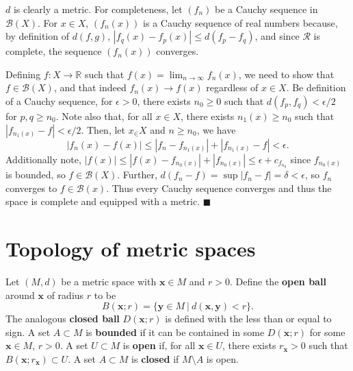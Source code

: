\documentclass[letter-paper]{tufte-book}
\newenvironment{proof}[1][Proof]{\begin{trivlist}
\item[\hskip \labelsep {\bfseries #1}]}{\end{trivlist}}
\newcommand{\xb}{\boldsymbol{x}}
\newcommand{\yb}{\boldsymbol{y}}
\newcommand{\qed}{\hfill$\blacksquare$}
\begin{document}
\begin{proof}
  $d$ is clearly a metric. For completeness, let $(f_n)$ be a Cauchy sequence in
  $\mathcal{B}(X)$. For $x\in X$, $(f_n(x))$ is a Cauchy sequence of real
  numbers because, by definition of $d(f,g)$, $|f_q(x) - f_p(x)| \leq d(f_p -
  f_q)$, and since $\mathcal{R}$ is complete, the sequence $(f_n(x))$ converges.
  
  Defining $f: X\to\mathbb{R}$ such that $f(x) = \lim_{n\to\infty} f_n(x)$, we
  need to show that $f\in\mathcal{B}(X)$, and that indeed $f_n(x) \to f(x)$
  regardless of $x\in X$. Be definition of a Cauchy sequence, for $\epsilon >0$,
  there exists $n_0 \geq 0$ such that $d(f_p, f_q) < \epsilon / 2$ for $p, q
  \geq n_0$. Note also that, for all $x\in X$, there exists $n_1(x) \geq n_0$
  such that $|f_{n_1(x)} - f| < \epsilon / 2$. Then, let $x_\in X$ and $n \geq
  n_0$, we have
  \begin{equation*}
    |f_n(x) - f(x)| \leq |f_n - f_{n_1(x)}| + |f_{n_1(x)} - f| < \epsilon.
  \end{equation*}
  Additionally note, $|f(x)| \leq |f(x) - f_{n_0(x)}| + |f_{n_0(x)}| \leq
  \epsilon + c_{f_{n_0}}$ since $f_{n_0(x)}$ is bounded, so $f \in
  \mathcal{B}(X)$. Further, $d(f_n - f) = \sup |f_n - f| = \delta < \epsilon$,
  so $f_n$ converges to $f \in \mathcal{B}(x)$. Thus every Cauchy sequence
  converges and thus the space is complete and equipped with a metric. \qed
\end{proof}


\section{Topology of metric spaces}

Let $(M, d)$ be a metric space with $\xb \in M$ and $r > 0$. Define the
\textbf{open ball} around $\xb$ of radius $r$ to be
\begin{equation*}
  B(\xb; r) = \{ \yb \in M\ |\ d(\xb, \yb) < r\}.
\end{equation*}
The analogous \textbf{closed ball} $D(\xb; r)$ is defined with the less than or
equal to sign. A set $A \subset M$ is \textbf{bounded} if it can be contained in
some $D(\xb; r)$ for some $\xb \in M$, $r > 0$. A set $U \subset M$ is
\textbf{open} if, for all $\xb \in U$, there exists $r_{\xb} > 0$ such that
$B(\xb; r_{\xb}) \subset U$. A set $A \subset M$ is \textbf{closed} if $M
\setminus A$ is open.
\end{document}
